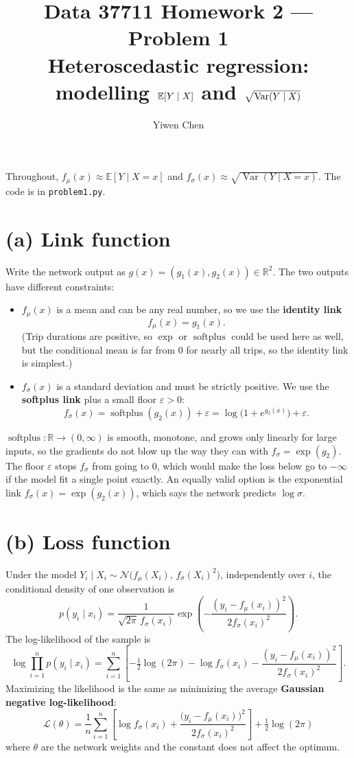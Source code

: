 \documentclass[11pt]{article}
\title{Data 37711 Homework 2 --- Problem 1\\
\large Heteroscedastic regression: modelling $\E[Y\mid X]$ and $\sqrt{\Var(Y\mid X)}$}
\author{Yiwen Chen}
\date{}
\newcommand{\E}{\mathbb{E}}
\newcommand{\Var}{\operatorname{Var}}
\newcommand{\R}{\mathbb{R}}
\newcommand{\softplus}{\operatorname{softplus}}
\begin{document}
\maketitle

Throughout, $f_\mu(x)\approx\E[Y\mid X=x]$ and $f_\sigma(x)\approx\sqrt{\Var(Y\mid X=x)}$.
The code is in \texttt{problem1.py}.

\section*{(a) Link function}

Write the network output as $g(x)=(g_1(x),g_2(x))\in\R^2$. The two outputs have different
constraints:
\begin{itemize}
  \item $f_\mu(x)$ is a mean and can be any real number, so we use the \textbf{identity link}
  \[
     f_\mu(x) = g_1(x).
  \]
  (Trip durations are positive, so $\exp$ or $\softplus$ could be used here as well, but the
  conditional mean is far from $0$ for nearly all trips, so the identity link is simplest.)
  \item $f_\sigma(x)$ is a standard deviation and must be strictly positive. We use the
  \textbf{softplus link} plus a small floor $\varepsilon>0$:
  \[
     f_\sigma(x) = \softplus(g_2(x)) + \varepsilon = \log\bigl(1+e^{g_2(x)}\bigr) + \varepsilon .
  \]
\end{itemize}
$\softplus:\R\to(0,\infty)$ is smooth, monotone, and grows only linearly for large inputs, so the
gradients do not blow up the way they can with $f_\sigma=\exp(g_2)$. The floor $\varepsilon$ stops
$f_\sigma$ from going to $0$, which would make the loss below go to $-\infty$ if the model fit a
single point exactly. An equally valid option is the exponential link
$f_\sigma(x)=\exp(g_2(x))$, which says the network predicts $\log\sigma$.

\section*{(b) Loss function}

Under the model $Y_i\mid X_i \sim \mathcal N\bigl(f_\mu(X_i),\, f_\sigma(X_i)^2\bigr)$, independently
over $i$, the conditional density of one observation is
\[
  p(y_i\mid x_i) = \frac{1}{\sqrt{2\pi}\,f_\sigma(x_i)}
     \exp\!\left(-\frac{(y_i-f_\mu(x_i))^2}{2 f_\sigma(x_i)^2}\right).
\]
The log-likelihood of the sample is
\[
  \log \prod_{i=1}^n p(y_i\mid x_i)
   = \sum_{i=1}^n\left[-\tfrac12\log(2\pi) - \log f_\sigma(x_i)
     - \frac{(y_i-f_\mu(x_i))^2}{2 f_\sigma(x_i)^2}\right].
\]
Maximizing the likelihood is the same as minimizing the average \textbf{Gaussian negative
log-likelihood}:
\begin{equation}\label{eq:nll}
  \boxed{\;
  \mathcal L(\theta) = \frac1n\sum_{i=1}^n\left[\log f_\sigma(x_i)
      + \frac{\bigl(y_i-f_\mu(x_i)\bigr)^2}{2 f_\sigma(x_i)^2}\right] + \tfrac12\log(2\pi)
  \;}
\end{equation}
where $\theta$ are the network weights and the constant does not affect the optimum.
\end{document}
